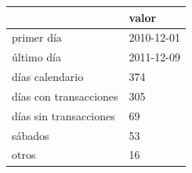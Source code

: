 \begin{tabular}{ll}
\toprule
 & valor \\
\midrule
primer día & 2010-12-01 \\
último día & 2011-12-09 \\
días calendario & 374 \\
días con transacciones & 305 \\
días sin transacciones & 69 \\
  sábados & 53 \\
  otros & 16 \\
\bottomrule
\end{tabular}
